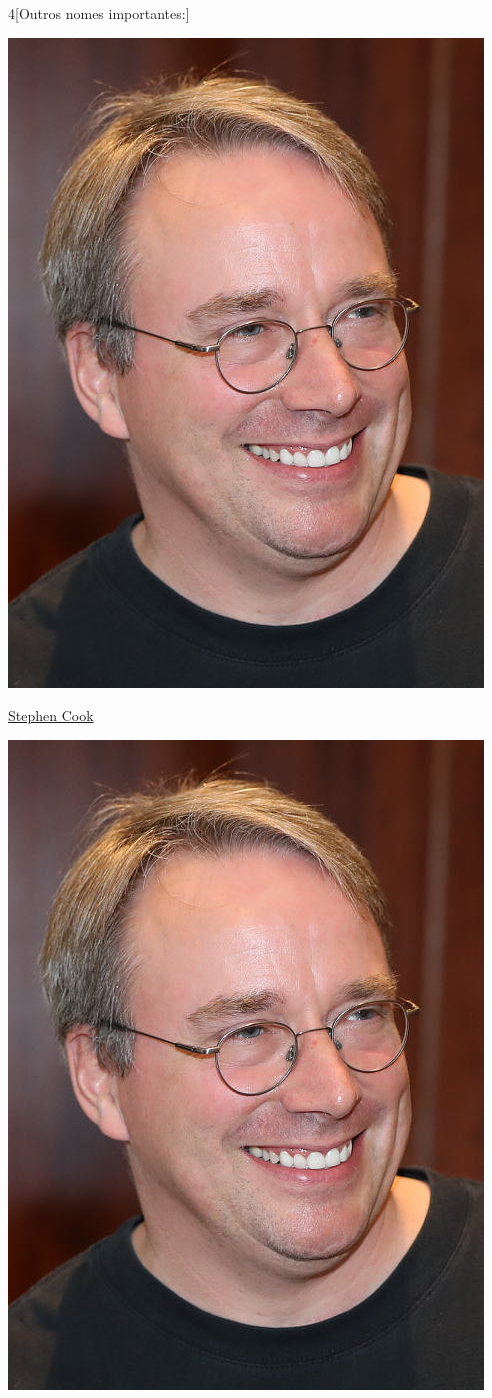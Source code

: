 \begin{multicols}{4}[Outros nomes importantes:]
\begin{center}
					\includegraphics[width=.8\columnwidth]{./IMG-GIT/CIENTISTAS/linus.jpeg}
\end{center}
				
\vfill\null
\columnbreak				
				
				\href{https://pt.wikipedia.org/wiki/Stephen_Cook}{Stephen Cook}
				
\begin{center}
					\includegraphics[width=.8\columnwidth]{./IMG-GIT/CIENTISTAS/linus.jpeg}
\end{center}
				

\end{multicols}
